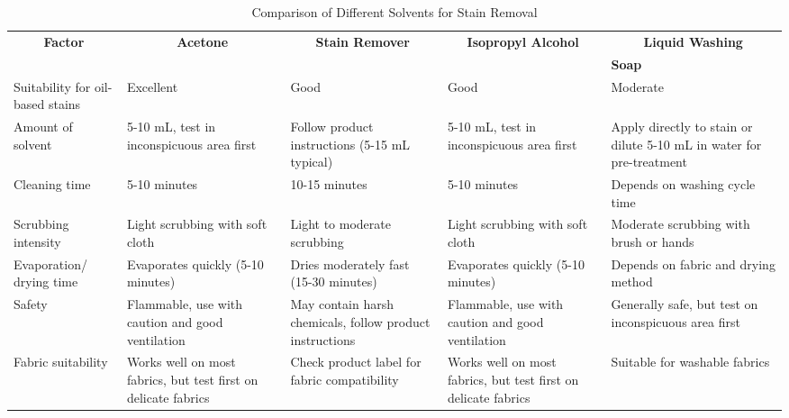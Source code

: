 \documentclass[table,french,english]{rapportCS}
\begin{document}
\begin{table}[h]
    \centering
    \vspace{2cm}
    \begin{tabular}{|p{2.5cm}|p{3cm}|p{3cm}|p{3cm}|p{3cm}|}
        
        \hline
        \multicolumn{1}{|c|}{\textbf{Factor}} &  \multicolumn{1}{|c|}{\textbf{Acetone}} &  \multicolumn{1}{|c|}{\textbf{Stain Remover}} &  \multicolumn{1}{|c|}{\textbf{Isopropyl Alcohol}} &  \multicolumn{1}{|c|}{\textbf{Liquid Washing}} \\
        &&&& \textbf{Soap}\\
        \hline
        Suitability for oil-based stains & Excellent & Good & Good & Moderate \\
        \hline
        Amount of solvent & 5-10 mL, test in inconspicuous area first & Follow product instructions (5-15 mL typical) & 5-10 mL, test in inconspicuous area first & Apply directly to stain or dilute 5-10 mL in water for pre-treatment \\
        \hline
        Cleaning time & 5-10 minutes & 10-15 minutes & 5-10 minutes & Depends on washing cycle time \\
        \hline
        Scrubbing intensity & Light scrubbing with soft cloth & Light to moderate scrubbing & Light scrubbing with soft cloth & Moderate scrubbing with brush or hands \\
        \hline
        Evaporation/ drying time & Evaporates quickly (5-10 minutes) & Dries moderately fast (15-30 minutes) & Evaporates quickly (5-10 minutes) & Depends on fabric and drying method \\
        \hline
        Safety & Flammable, use with caution and good ventilation & May contain harsh chemicals, follow product instructions & Flammable, use with caution and good ventilation & Generally safe, but test on inconspicuous area first \\
        \hline
        Fabric suitability & Works well on most fabrics, but test first on delicate fabrics & Check product label for fabric compatibility & Works well on most fabrics, but test first on delicate fabrics & Suitable for washable fabrics \\
        \hline
        
    \end{tabular}
    \caption{Comparison of Different Solvents for Stain Removal}
    \label{tab:solvent_comparison}
\end{table}
\newpage
\end{document}
